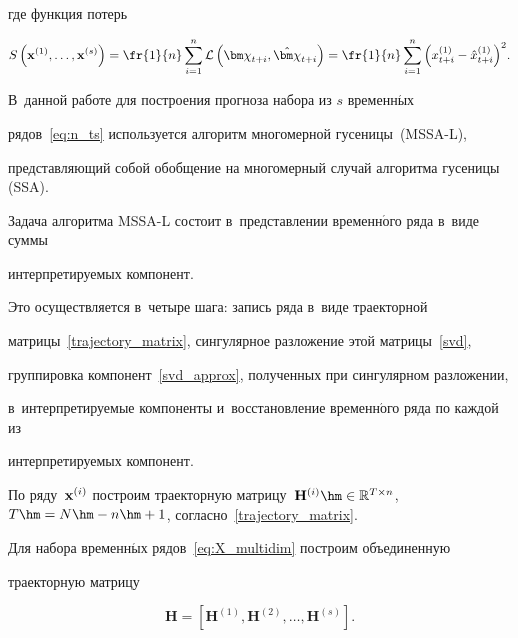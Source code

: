 где функция потерь

\begin{equation*}


S\left(\bx^{(1)}, \ldots, \bx^{(s)}\right)= 

\fr{1}{n}\sum\limits_{i = 1}^{n}{\mathcal{L}\left({\bm 

\chi}_{t + i}, \hat{\bm \chi}_{t + i}\right)} = \fr{1}{n}\sum\limits_{i = 

1}^{n}{\left({x}^{(1)}_{t + i} - {\hat{x}}^{(1)}_{t + i} \right)^2}.

\end{equation*}





В~данной работе для построения прогноза набора из $s$ временн$\acute{\mbox{ы}}$х 

рядов~\eqref{eq:n_ts}  используется алгоритм многомерной гусеницы~(MSSA-L), 

пред\-став\-ля\-ющий собой обобщение на многомерный случай алгоритма гусеницы (SSA).

Задача алгоритма MSSA-L состоит в~представлении временн$\acute{\mbox{о}}$го ряда в~виде суммы 

интерпретируемых компонент.

Это осуществляется в~четыре шага: запись ряда в~виде траекторной 

мат\-ри\-цы~\eqref{trajectory_matrix}, сингулярное разложение этой мат\-ри\-цы~\eqref{svd}, 

группировка компонент~\eqref{svd_approx}, полученных при сингулярном разложении, 

в~интерпретируемые компоненты и~восстановление временн$\acute{\mbox{о}}$го ряда по каждой из 

интерпретируемых компонент.



По ряду~$\bx^{(i)}$ построим траекторную мат\-ри\-цу~$\mathbf{H}^{(i)} \hm\in 

\mathbb{R}^{T \times n}$, $T\hm = N \hm- n \hm+ 1$, согласно~\eqref{trajectory_matrix}.

Для набора временн$\acute{\mbox{ы}}$х рядов~\eqref{eq:X_multidim} построим объединенную 

траекторную мат\-рицу

\begin{equation*}

\mathbf{H} = \left[\mathbf{H}^{(1)}, 

\mathbf{H}^{(2)}, \ldots, \mathbf{H}^{(s)}\right].

\end{equation*}




